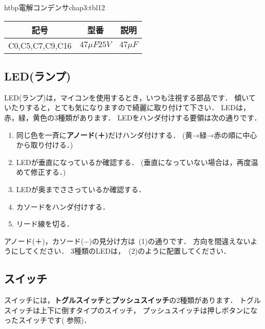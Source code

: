 \begin{mytable}{htbp}{電解コンデンサ}{chap3:tbl12}
\begin{tabular}{|l|l|l|}
\hline
\multicolumn{1}{|c|}{記号} &
\multicolumn{1}{c|}{型番} &
\multicolumn{1}{c|}{説明} \\
\hline
C0,C5,C7,C9,C16 & $ 47 \mu F  25V $ & $ 47 \mu F$ \\
\hline
\end{tabular}
\end{mytable}


\newpage
\subsection{LED(ランプ)}
LED(ランプ)は，マイコンを使用するとき，いつも注視する部品です．
傾いていたりすると，とても気になりますので綺麗に取り付けて下さい．
LEDは，赤，緑，黄色の3種類があります．
LEDをハンダ付けする要領は次の通りです．

\begin{enumerate}
\item 同じ色を一斉に{\bf アノード(＋)}だけハンダ付けする．
(黄→緑→赤の順に中心から取り付ける．)
\item LEDが垂直になっているか確認する．
(垂直になっていない場合は，再度温めて修正する．)
\item LEDが奥までささっているか確認する．
\item カソードをハンダ付けする．
\item リード線を切る．
\end{enumerate}

アノード(＋)，カソード(−)の見分け方は~(1)の通りです．
方向を間違えないようにしてください．
3種類のLEDは，~(2)のように配置してください．


\subsection{スイッチ}


スイッチには，{\bf トグルスイッチ}と{\bf プッシュスイッチ}の2種類があります．
トグルスイッチは上下に倒すタイプのスイッチ，
プッシュスイッチは押しボタンになったスイッチです( 参照)．

